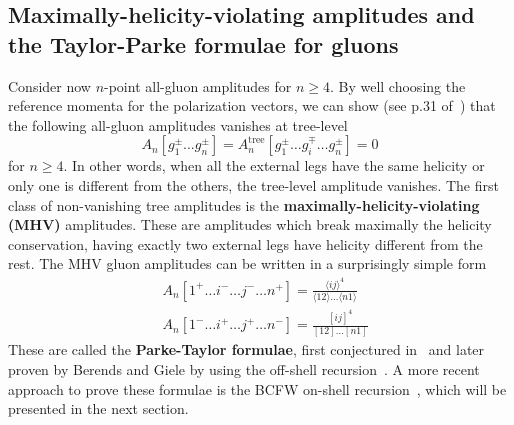 \subsection*{Maximally-helicity-violating amplitudes and the Taylor-Parke formulae for gluons}
Consider now $n$-point all-gluon amplitudes for $n\geq 4$. 
By well choosing the reference momenta for the polarization vectors, we can show (see p.31 of~\cite{Elvang:2013cua}) that the following all-gluon amplitudes vanishes at tree-level
\begin{equation}
A_n[g_1^\pm \ldots g_n^\pm] = A^{\mathrm{tree}}_n[g_1^\pm \ldots g_i^\mp \ldots g_n^\pm] = 0
\end{equation}
for $n\geq 4$.
In other words, when all the external legs have the same helicity or only one is different from the others, the tree-level amplitude vanishes.
The first class of non-vanishing tree amplitudes is the \textbf{maximally-helicity-violating (MHV)} amplitudes.
These are amplitudes which break maximally the helicity conservation, having exactly two external legs have helicity different from the rest.
The MHV gluon amplitudes can be written in a surprisingly simple form
\begin{equation}
\begin{split}
& A_n[1^+\ldots i^-\ldots j^-\ldots n^+] = 
\frac{\langle ij \rangle^4}{\langle 12 \rangle\ldots \langle n1 \rangle}
\\
& A_n[1^-\ldots i^+\ldots j^+\ldots n^-] = 
\frac{[ ij]^4}{[ 12 ]\ldots [n1 ]}
\end{split}
\end{equation}
These are called the \textbf{Parke-Taylor formulae}, first conjectured in~\cite{PhysRevLett.56.2459} and later proven by Berends and Giele by using the off-shell recursion~\cite{BERENDS1988759}. 
A more recent approach to prove these formulae is the BCFW on-shell recursion~\cite{BRITTO2005499, PhysRevLett.94.181602}, which will be presented in the next section. 






